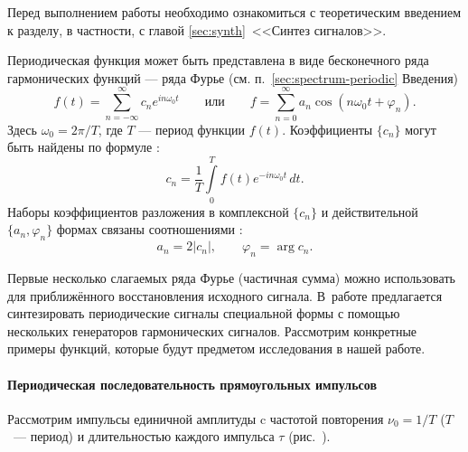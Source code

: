 


Перед выполнением работы необходимо ознакомиться с теоретическим введением
к разделу, в частности, с главой \ref{sec:synth}~<<Синтез сигналов>>.


Периодическая функция может быть представлена в виде бесконечного ряда
гармонических функций --- ряда Фурье (см. п.~\ref{sec:spectrum-periodic}
Введения)
\begin{equation*}
f(t) = \sum_{n=-\infty}^{\infty} c_n e^{in\omega_0 t}\qquad\text{или}\qquad
f=\sum_{n=0}^{\infty} a_n \cos (n\omega_0 t + \varphi_n).
\end{equation*}
Здесь $\omega_0 = 2\pi/T$, где $T$ --- период функции $f(t)$.
Коэффициенты $\{c_n\}$ могут быть найдены по формуле
:
\begin{equation*}
    c_n=\frac{1}{T}\int\limits_{0}^{T} f(t)e^{-in\omega_0 t}\,dt.
\end{equation*}
Наборы коэффициентов разложения в комплексной $\{c_n\}$ и действительной
$\{a_n,\varphi_n\}$ формах связаны соотношениями :
\begin{equation*}
a_n = 2|c_n|,\qquad \varphi_n = \arg c_n.
\end{equation*}

Первые несколько слагаемых ряда Фурье (частичная сумма) можно использовать
для приближённого восстановления исходного сигнала.
В~работе предлагается синтезировать периодические сигналы специальной формы
с помощью нескольких генераторов гармонических сигналов.
Рассмотрим конкретные примеры функций, которые будут предметом
исследования в нашей работе.

\paragraph{Периодическая последовательность прямоугольных импульсов}
Рассмотрим импульсы единичной амплитуды c частотой повторения
$\nu_{0}=1/T$ ($T$~--- период) и длительностью каждого
импульса $\tau$ (рис.~).

